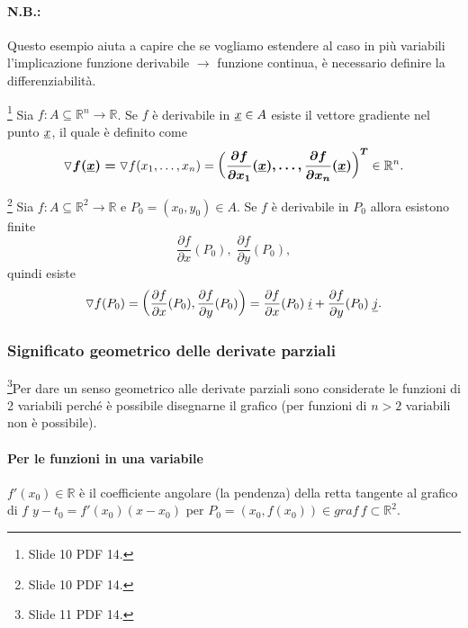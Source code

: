 \paragraph{N.B.:} Questo esempio aiuta a capire che se vogliamo estendere al caso in più variabili l'implicazione funzione derivabile $\rightarrow$ funzione continua, è necessario definire la differenziabilità.

\begin{definition}[Gradiente]\footnote{Slide 10 PDF 14.}
   Sia $f:A\subseteq\mathbb R^n\rightarrow\mathbb R$. Se $f$ è derivabile in $\uline x\in A$ esiste il vettore gradiente nel punto $\uline x$, il quale è definito come
   \begin{equation}
       \boldsymbol{\triangledown f(\uline x)=}\triangledown f(x_1,\hdots, x_n)=\boldsymbol{\left(\frac{\partial f}{\partial x_1}(\uline x),\hdots, \frac{\partial f}{\partial x_n}(\uline x)\right)^T}\in\mathbb R^n.
   \end{equation}
\end{definition}

\begin{example}\footnote{Slide 10 PDF 14.}
    Sia $f:A\subseteq\mathbb R^2\rightarrow\mathbb R$ e $P_0=(x_0,y_0)\in A$. Se $f$ è derivabile in $P_0$ allora esistono finite
    \begin{equation*}
        \frac{\partial f}{\partial x}(P_0),\; \frac{\partial f}{\partial y}(P_0),
    \end{equation*}
    quindi esiste
    \begin{equation*}
        \triangledown f(P_0)=\left(\frac{\partial f}{\partial x}(P_0),\frac{\partial f}{\partial y}(P_0)\right)=\frac{\partial f}{\partial x}(P_0)\; \uline i+ \frac{\partial f}{\partial y}(P_0)\; \uline j.
    \end{equation*}
\end{example}

\subsubsection{Significato geometrico delle derivate parziali}
\footnote{Slide 11 PDF 14.}Per dare un senso geometrico alle derivate parziali sono considerate le funzioni di 2 variabili perché è possibile disegnarne il grafico (per funzioni di $n>2$ variabili non è possibile).

\paragraph{Per le funzioni in una variabile} $f'(x_0)\in\mathbb R$ è il coefficiente angolare (la pendenza) della retta tangente al grafico di $f$ $y-t_0=f'(x_0)(x-x_0)$ per $P_0=(x_0,f(x_0))\in graf\, f\subset \mathbb R^2$.

